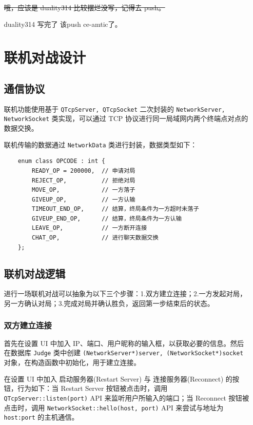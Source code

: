 \documentclass{noithesis}
\begin{document}
	\sout{哦，应该是 duality314 比较摆烂没写，记得去 push。}
	
	duality314 写完了 该push ce-amtic了。
	\section{联机对战设计}
	
	\subsection{通信协议}
	
	联机功能使用基于 \verb|QTcpServer, QTcpSocket| 二次封装的 \verb|NetworkServer, NetworkSocket| 类实现，可以通过 TCP 协议进行同一局域网内两个终端点对点的数据交换。
	
	联机传输的数据通过 \verb|NetworkData| 类进行封装，数据类型如下：
	\begin{lstlisting}
	enum class OPCODE : int {
    	READY_OP = 200000,  // 申请对局
    	REJECT_OP,          // 拒绝对局
	    MOVE_OP,            // 一方落子
	    GIVEUP_OP,          // 一方认输
	    TIMEOUT_END_OP,     // 结算，终局条件为一方超时未落子
	    GIVEUP_END_OP,      // 结算，终局条件为一方认输
	    LEAVE_OP,           // 一方断开连接
	    CHAT_OP,            // 进行聊天数据交换
	};
	\end{lstlisting}

    \subsection{联机对战逻辑}
    
    进行一场联机对战可以抽象为以下三个步骤：1.双方建立连接；2.一方发起对局，另一方确认对局；3.完成对局并确认胜负，返回第一步结束后的状态。
	
	\subsubsection{双方建立连接}
	
	首先在设置 UI 中加入 IP、端口、用户昵称的输入框，以获取必要的信息。然后在数据库 \verb|Judge| 类中创建 \verb|(NetworkServer*)server, (NetworkSocket*)socket| 对象，在构造函数中初始化，用于建立连接。
	
	在设置 UI 中加入 启动服务器(Restart Server) 与 连接服务器(Reconnect) 的按钮，行为如下：当 Restart Server 按钮被点击时，调用 \verb|QTcpServer::listen(port)| API 来监听用户所输入的端口；当 Reconnect 按钮被点击时，调用 \verb|NetworkSocket::hello(host, port)| API 来尝试与地址为 \verb|host:port| 的主机通信。
	
\end{document}
